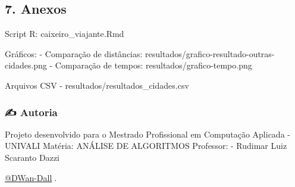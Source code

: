 \documentclass[
]{article}
\begin{document}
\hypertarget{anexos}{%
\subsection{7. Anexos}\label{anexos}}

Script R: caixeiro\_viajante.Rmd

Gráficos: - Comparação de distâncias:
resultados/grafico-resultado-outras-cidades.png - Comparação de tempos:
resultados/grafico-tempo.png

Arquivos CSV - resultados/resultados\_cidades.csv

\hypertarget{autoria}{%
\subsubsection{✍️ Autoria}\label{autoria}}

Projeto desenvolvido para o Mestrado Profissional em Computação Aplicada
- UNIVALI Matéria: ANÁLISE DE ALGORITMOS Professor: - Rudimar Luiz
Scaranto Dazzi

\href{https://github.com/DWan-Dall}{@DWan-Dall}💜.
\end{document}
